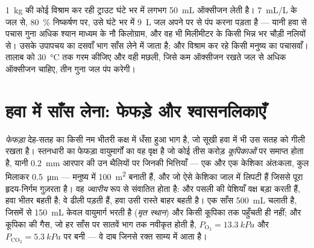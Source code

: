 \begin{example}[जल की क़ीमत]\label{ex:b1:gas-exchange:priceofwater}
\qty{1}{kg} की कोई विश्राम कर रही ट्राउट घंटे भर में लगभग \qty{50}{mL}
ऑक्सीजन लेती है। \qty{7}{mL/L} के जल से, \qty{80}{\%} निष्कर्षण पर, उसे
घंटे भर में \qty{9}{L} जल अपने  पर से पंप करना पड़ता है --- यानी
हवा से पचास गुना अधिक श्यान माध्यम के नौ किलोग्राम, और वह भी मिलीमीटर के
किसी भिन्न भर चौड़ी नलियों से। उसके उपापचय का दसवाँ भाग साँस लेने में
जाता है; और विश्राम कर रहे किसी मनुष्य का पचासवाँ। तालाब को
\qty{30}{\celsius} तक गरम कीजिए और वही मछली, जिसे कम ऑक्सीजन रखते जल से
अधिक ऑक्सीजन चाहिए, तीन गुना जल पंप करेगी।
\end{example}

\section{हवा में साँस लेना: फेफड़े और श्वासनलिकाएँ}

\begin{definition}[स्तनधारी का फेफड़ा]\label{def:b1:gas-exchange:lung}
\emph{फेफड़ा} देह-सतह का किसी नम भीतरी कक्ष में धँसा हुआ भाग है, जो सूखी
हवा में भी उस सतह को गीली रखता है। स्तनधारी का फेफड़ा वायुमार्गों का वह
वृक्ष है जो कोई तीस करोड़ \emph{कूपिकाओं} पर समाप्त होता है, यानी
\qty{0.2}{mm} आरपार की उन थैलियों पर जिनकी भित्तियाँ --- एक  
और एक केशिका अंतःकला, कुल मिलाकर \qty{0.5}{\micro m} --- मनुष्य में
\qty{100}{m^2} बनाती हैं, और जो ऐसे केशिका जाल में लिपटी हैं जिससे पूरा
हृदय-निर्गम गुज़रता है। वह \emph{ज्वारीय} रूप से संवातित होता है:
 और पसली की पेशियाँ वक्ष बड़ा करती हैं, हवा भीतर बहती है; वे ढीली
पड़ती हैं, हवा उसी रास्ते बाहर बहती है। एक साँस \qty{500}{mL} चलाती है,
जिसमें से \qty{150}{mL} केवल वायुमार्ग भरती है (\emph{मृत स्थान}) और
किसी कूपिका तक पहुँचती ही नहीं; और कूपिका की गैस, जो हर साँस पर सातवें
भाग तक नवीकृत होती है, $P_{\mathrm{O_2}} =
\qty{13.3}{kPa}$ और $P_{\mathrm{CO_2}} = \qty{5.3}{kPa}$ पर बनी --- वे दाब
जिनसे रक्त साम्य में आता है।
\end{definition}

